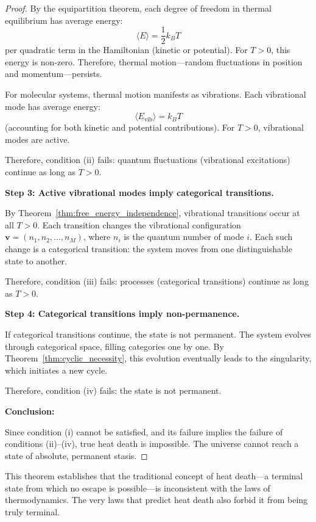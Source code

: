 \documentclass[12pt,a4paper]{article}
\theoremstyle{definition}
\theoremstyle{remark}
\begin{document}
\begin{proof}
By the equipartition theorem, each degree of freedom in thermal equilibrium has average energy:
\begin{equation}
\langle E \rangle = \frac{1}{2} k_B T
\end{equation}
per quadratic term in the Hamiltonian (kinetic or potential). For $T > 0$, this energy is non-zero. Therefore, thermal motion—random fluctuations in position and momentum—persists.

For molecular systems, thermal motion manifests as vibrations. Each vibrational mode has average energy:
\begin{equation}
\langle E_{\text{vib}} \rangle = k_B T
\end{equation}
(accounting for both kinetic and potential contributions). For $T > 0$, vibrational modes are active.

Therefore, condition (ii) fails: quantum fluctuations (vibrational excitations) continue as long as $T > 0$.

\textbf{Step 3: Active vibrational modes imply categorical transitions.}

By Theorem~\ref{thm:free_energy_independence}, vibrational transitions occur at all $T > 0$. Each transition changes the vibrational configuration $\mathbf{v} = (n_1, n_2, \ldots, n_M)$, where $n_i$ is the quantum number of mode $i$. Each such change is a categorical transition: the system moves from one distinguishable state to another.

Therefore, condition (iii) fails: processes (categorical transitions) continue as long as $T > 0$.

\textbf{Step 4: Categorical transitions imply non-permanence.}

If categorical transitions continue, the state is not permanent. The system evolves through categorical space, filling categories one by one. By Theorem~\ref{thm:cyclic_necessity}, this evolution eventually leads to the singularity, which initiates a new cycle.

Therefore, condition (iv) fails: the state is not permanent.

\textbf{Conclusion:}

Since condition (i) cannot be satisfied, and its failure implies the failure of conditions (ii)–(iv), true heat death is impossible. The universe cannot reach a state of absolute, permanent stasis.
\end{proof}

This theorem establishes that the traditional concept of heat death—a terminal state from which no escape is possible—is inconsistent with the laws of thermodynamics. The very laws that predict heat death also forbid it from being truly terminal.
\end{document}
